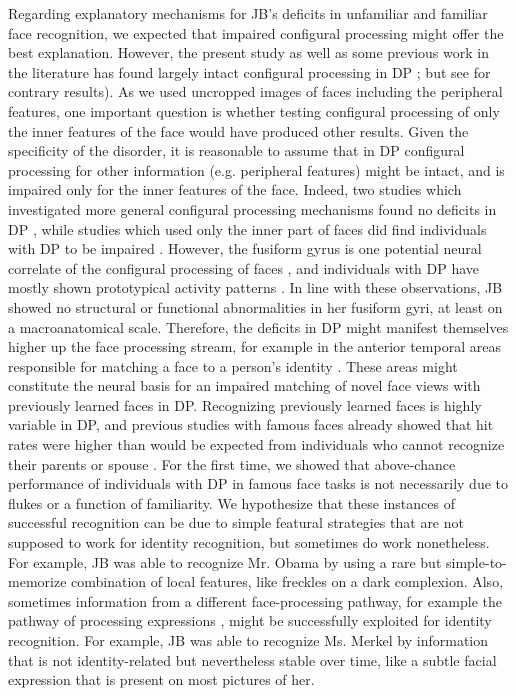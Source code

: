 \documentclass[fleqn,10pt]{SelfArx} %
\begin{document}
Regarding explanatory mechanisms for JB's deficits in unfamiliar and familiar face recognition, we expected that impaired configural processing might offer the best explanation. However, the present study as well as some previous work in the literature has found largely intact configural processing in DP \citep{Duchaine_2000, Le_Grand_2006}; but see \citet{Behrmann_2005} for contrary results). As we used uncropped images of faces including the peripheral features, one important question is whether testing configural processing of only the inner features of the face would have produced other results. Given the specificity of the disorder, it is reasonable to assume that in DP configural processing for other information (e.g. peripheral features) might be intact, and is impaired only for the inner features of the face. Indeed, two studies which investigated more general configural processing mechanisms found no deficits in DP \citep{Duchaine_2000, Le_Grand_2006}, while studies which used only the inner part of faces did find individuals with DP to be impaired \citep{Avidan_2011, Palermo_2011}. However, the fusiform gyrus is one potential neural correlate of the configural processing of faces \citep{Schiltz_2006}, and individuals with DP have mostly shown prototypical activity patterns \citep{Hasson_2003, Avidan_2005, Furl_2011}. In line with these observations, JB showed no structural or functional abnormalities in her fusiform gyri, at least on a macroanatomical scale. Therefore, the deficits in DP might manifest themselves higher up the face processing stream, for example in the anterior temporal areas responsible for matching a face to a person's identity \citep{Kriegeskorte_2007, Landi_2017}. These areas might constitute the neural basis for an impaired matching of novel face views with previously learned faces \citep{Duchaine_2000} in DP. Recognizing previously learned faces is highly variable in DP, and previous studies with famous faces already showed that hit rates were higher than would be expected from individuals who cannot recognize their parents or spouse \citep{Rivolta_2012, Garrido_2009}. For the first time, we showed that above-chance performance of individuals with DP in famous face tasks is not necessarily due to flukes or a function of familiarity. We hypothesize that these instances of successful recognition can be due to simple featural strategies that are not supposed to work for identity recognition, but sometimes do work nonetheless. For example, JB was able to recognize Mr. Obama by using a rare but simple-to-memorize combination of local features, like freckles on a dark complexion. Also, sometimes information from a different face-processing pathway, for example the pathway of processing expressions \citep{Haxby_2000, Calder_2005}, might be successfully exploited for identity recognition. For example, JB was able to recognize Ms. Merkel by information that is not identity-related but nevertheless stable over time, like a subtle facial expression that is present on most pictures of her.
\end{document}
